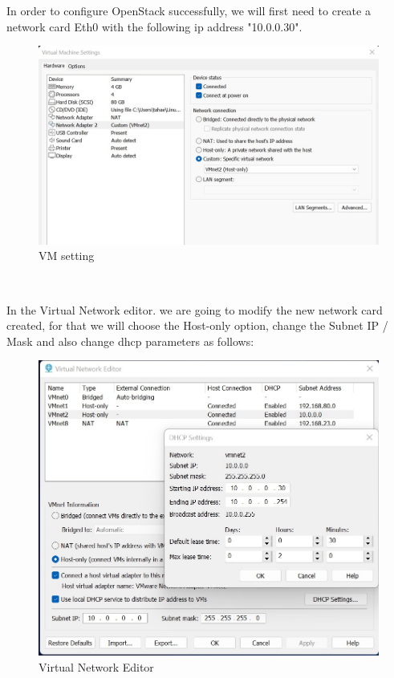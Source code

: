 \begin{spacing}{1.2}
\par In order to configure OpenStack successfully, we will first need to create a network card
Eth0 with the following ip address "10.0.0.30".
\\
\begin{figure}[!htb] 
\begin{center} 
\includegraphics[width=1\linewidth]{Cloud/Config/VM setting} 
\end{center} 
\caption{VM setting} 
\end{figure}  \FloatBarrier
\\
\par In the Virtual Network editor. we are going to modify the new network card created,
for that we will choose the Host-only option, change the Subnet IP / Mask and also change
dhcp parameters as follows: 
\\
\begin{figure}[!htb] 
\begin{center} 
\includegraphics[width=1\linewidth]{Cloud/Config/Virtual Network Editor} 
\end{center} 
\caption{Virtual Network Editor} 
\end{figure}  \FloatBarrier
\\

\end{spacing}
